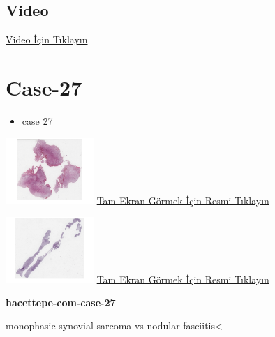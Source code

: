 \documentclass[
  letterpaper,
  DIV=11,
  numbers=noendperiod]{scrreprt}
\providecommand{\tightlist}{%
  \setlength{\itemsep}{0pt}\setlength{\parskip}{0pt}}\usepackage{longtable,booktabs,array}
\begin{document}
\hypertarget{video-24}{%
\subsection{Video}\label{video-24}}

\href{https://www.youtube.com/watch?v=UHadS40tpkY}{Video İçin Tıklayın}

\hypertarget{sec-hacettepe-case-of-the-month-case-27}{%
\section{Case-27}\label{sec-hacettepe-case-of-the-month-case-27}}

\begin{itemize}
\tightlist
\item
  \href{https://www.youtube.com/watch?v=c2ePAdTH00g\&ab_channel=KemalKosemehmetoglu}{case
  27}
\end{itemize}

\href{https://images.patolojiatlasi.com/hacettepe-com-case-27/HE1.html}{\includegraphics[width=0.25\textwidth,height=\textheight]{./screenshots/hacettepe-com-case-27-1_screenshot.png}}
\href{https://images.patolojiatlasi.com/hacettepe-com-case-27/HE1.html}{Tam
Ekran Görmek İçin Resmi Tıklayın}

\href{https://images.patolojiatlasi.com/hacettepe-com-case-27/HE2.html}{\includegraphics[width=0.25\textwidth,height=\textheight]{./screenshots/hacettepe-com-case-27-2_screenshot.png}}
\href{https://images.patolojiatlasi.com/hacettepe-com-case-27/HE2.html}{Tam
Ekran Görmek İçin Resmi Tıklayın}

\textbf{hacettepe-com-case-27}

\begin{tcolorbox}[enhanced jigsaw, left=2mm, toprule=.15mm, rightrule=.15mm, bottomrule=.15mm, leftrule=.75mm, colback=white, colframe=quarto-callout-tip-color-frame, toptitle=1mm, breakable, titlerule=0mm, colbacktitle=quarto-callout-tip-color!10!white, bottomtitle=1mm, title=\textcolor{quarto-callout-tip-color}{\faLightbulb}\hspace{0.5em}{Tanı}, arc=.35mm, opacitybacktitle=0.6, opacityback=0, coltitle=black]

monophasic synovial sarcoma vs nodular fasciitis\textless{}

\end{tcolorbox}
\end{document}
